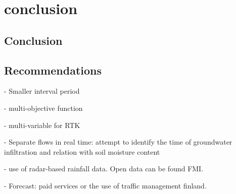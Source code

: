 \chapter{conclusion}

\section{Conclusion}

\section{Recommendations}


- Smaller interval period

- multi-objective function

- multi-variable for RTK

- Separate flows in real time: attempt to identify the time of groundwater infiltration and relation with soil moisture content

- use of radar-based rainfall data. Open data can be found FMI. 

- Forecast: paid services or the use of traffic management finland.